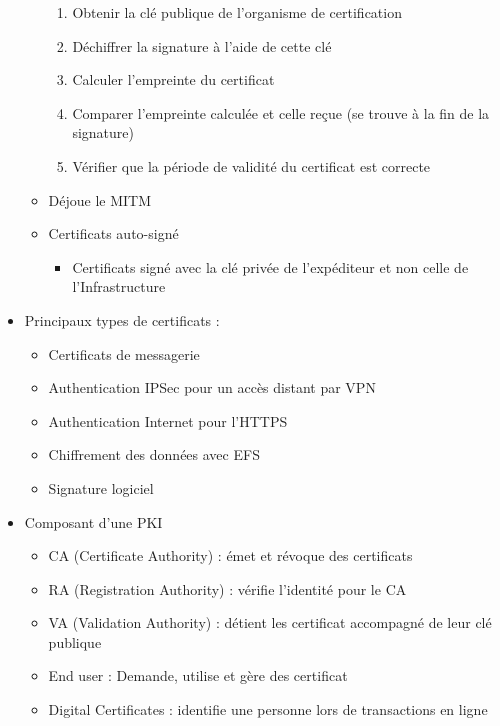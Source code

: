 \documentclass[a4paper]{article}
\begin{document}
\begin{itemize}[label=\textbullet, font=\Large]
\begin{itemize}[label=, font=\scriptsize]
        \begin{enumerate}
            \item Obtenir la clé publique de l'organisme de certification
            \item Déchiffrer la signature à l'aide de cette clé
            \item Calculer l'empreinte du certificat
            \item Comparer l'empreinte calculée et celle reçue (se trouve à la fin de la signature)
            \item Vérifier que la période de validité du certificat est correcte
        \end{enumerate}
        \item Déjoue le MITM
        \item Certificats auto-signé
        \begin{itemize}
            \item Certificats signé avec la clé privée de l'expéditeur et non celle de l'Infrastructure
        \end{itemize}
    \end{itemize}
    \item Principaux types de certificats :
    \begin{itemize}[label=, font=\scriptsize]
        \item Certificats de messagerie
        \item Authentication IPSec pour un accès distant par VPN
        \item Authentication Internet pour l'HTTPS
        \item Chiffrement des données avec EFS
        \item Signature logiciel
    \end{itemize}
    \item Composant d'une PKI
    \begin{itemize}[label=, font=\scriptsize]
        \item CA (Certificate Authority) : émet et révoque des certificats
        \item RA (Registration Authority) : vérifie l'identité pour le CA
        \item VA (Validation Authority) : détient les certificat accompagné de leur clé publique
        \item End user : Demande, utilise et gère des certificat
        \item Digital Certificates : identifie une personne lors de transactions en ligne

\end{itemize}
\end{itemize}
\end{document}
